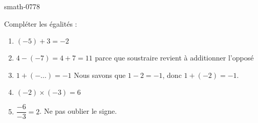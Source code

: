 
\begin{corrige}{smath-0778}

    Compléter les égalités :
        \begin{enumerate}
            \item
                \( (-5)+3=-2\)
            \item
                \( 4-(-7)=4+7=11\) parce que soustraire revient à additionner l'opposé
            \item
                \( 1+(-\ldots)=-1\) Nous savons que \( 1-2=-1\), donc \( 1+(-2)=-1\).
            \item
                \( (-2)\times (-3)=6\)
            \item
                \( \dfrac{ -6 }{ -3 }=2\). Ne pas oublier le signe.
        \end{enumerate}

\end{corrige}
